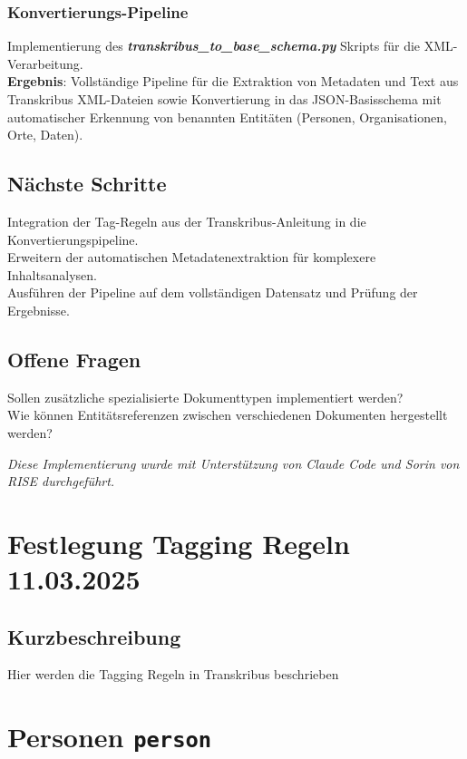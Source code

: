 \documentclass{article}
\begin{document}
\subsubsection*{\small Konvertierungs-Pipeline}
 Implementierung des \textbf{\textit{transkribus\_to\_base\_schema.py}} Skripts für die XML-Verarbeitung.\\
\textbf{Ergebnis}: Vollständige Pipeline für die Extraktion von Metadaten und Text aus Transkribus XML-Dateien sowie Konvertierung in das JSON-Basisschema mit automatischer Erkennung von benannten Entitäten (Personen, Organisationen, Orte, Daten).

\subsection*{Nächste Schritte}
 Integration der Tag-Regeln aus der Transkribus-Anleitung in die Konvertierungspipeline. \\
 Erweitern der automatischen Metadatenextraktion für komplexere Inhaltsanalysen.\\
 Ausführen der Pipeline auf dem vollständigen Datensatz und Prüfung der Ergebnisse.\\

\subsection*{Offene Fragen}
 Sollen zusätzliche spezialisierte Dokumenttypen implementiert werden?\\
 Wie können Entitätsreferenzen zwischen verschiedenen Dokumenten hergestellt werden?

\textit{Diese Implementierung wurde mit Unterstützung von Claude Code und Sorin von RISE durchgeführt.}

\noindent\hrulefill
\section{Festlegung Tagging Regeln \small 11.03.2025 } %

\subsection*{Kurzbeschreibung}
Hier werden die Tagging Regeln in Transkribus beschrieben
 
\section*{Personen \texttt{\texttt{\textbf{{\colorbox{person}{person}}}}}}
\end{document}
